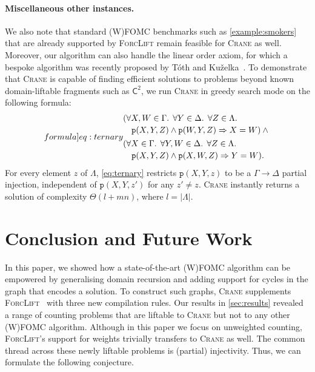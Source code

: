 \documentclass{article}
\theoremstyle{definition}
\theoremstyle{remark}
\newcommand{\Ctwo}{$\mathsf{C}^{2}$}
\begin{document}
\paragraph{Miscellaneous other instances.}
We also note that standard (W)FOMC benchmarks such as \cref{example:smokers}
that are already supported by \textsc{ForcLift} remain feasible for
\textsc{Crane} as well. Moreover, our algorithm can also handle the linear order
axiom, for which a bespoke algorithm was recently proposed by T{\'{o}}th and
Ku\v{z}elka~. To demonstrate that
\textsc{Crane} is capable of finding efficient solutions to problems beyond
known domain-liftable fragments such as \Ctwo{}, we run \textsc{Crane} in greedy
search mode on the following formula:
\begin{equation}\label[formula]{eq:ternary}
  \begin{split}
    &\begin{multlined}[t]
      (\forall X,W \in \Gamma\text{. }\forall Y \in \Delta\text{. }\forall Z \in \Lambda\text{. }\\
      \texttt{p}(X, Y, Z) \land \texttt{p}(W, Y, Z) \Rightarrow X = W) \land{}
    \end{multlined}\\
    &\begin{multlined}[t]
      (\forall X \in \Gamma\text{. }\forall Y,W \in \Delta\text{. }\forall Z \in \Lambda\text{. }\\
      \texttt{p}(X, Y, Z) \land \texttt{p}(X, W, Z) \Rightarrow Y = W).
    \end{multlined}
  \end{split}
\end{equation}
For every element $z$ of $\Lambda$, \cref{eq:ternary} restricts
$\texttt{p}(X, Y, z)$ to be a $\Gamma \to \Delta$ partial injection, independent
of $\texttt{p}(X, Y, z')$ for any $z' \ne z$. \textsc{Crane} instantly returns a
solution of complexity $\Theta(l+mn)$, where $l = |\Lambda|$.

\section{Conclusion and Future Work}\label{sec:conclusion}

In this paper, we showed how a state-of-the-art (W)FOMC algorithm can be
empowered by generalising domain recursion and adding support for cycles in the
graph that encodes a solution. To construct such graphs, \textsc{Crane}
supplements \textsc{ForcLift}~\cite{DBLP:conf/ijcai/BroeckTMDR11} with three new
compilation rules. Our results in \cref{sec:results} revealed a range of
counting problems that are liftable to \textsc{Crane} but not to any other
(W)FOMC algorithm. Although in this paper we focus on unweighted counting,
\textsc{ForcLift}'s support for weights trivially transfers to \textsc{Crane} as
well. The common thread across these newly liftable problems is (partial)
injectivity. Thus, we can formulate the following conjecture.
\end{document}
